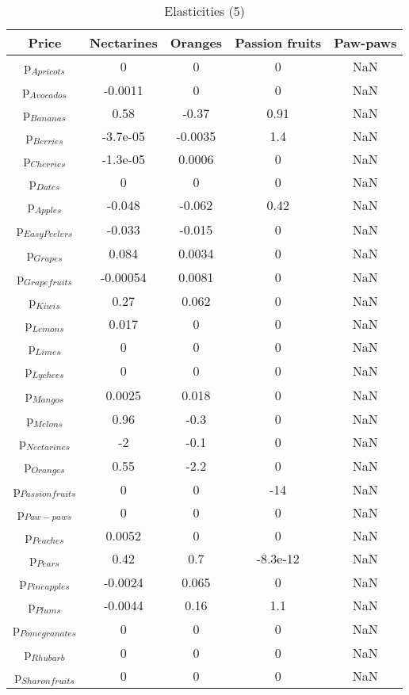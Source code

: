 \documentclass[11pt]{article}
\begin{document}
\begin{table}[h]
\caption{Elasticities (5)}
\label{Table: elasticities 5}
\begin{center}
\begin{tabular}{ccccc}
Price & Nectarines & Oranges & Passion fruits & Paw-paws \\ \hline
p$_{Apricots}$ & 0 & 0 & 0 & NaN \\ 
p$_{Avocados}$ & -0.0011 & 0 & 0 & NaN \\ 
p$_{Bananas}$ & 0.58 & -0.37 & 0.91 & NaN \\ 
p$_{Berries}$ & -3.7e-05 & -0.0035 & 1.4 & NaN \\ 
p$_{Cherries}$ & -1.3e-05 & 0.0006 & 0 & NaN \\ 
p$_{Dates}$ & 0 & 0 & 0 & NaN \\ 
p$_{Apples}$ & -0.048 & -0.062 & 0.42 & NaN \\ 
p$_{Easy Peelers}$ & -0.033 & -0.015 & 0 & NaN \\ 
p$_{Grapes}$ & 0.084 & 0.0034 & 0 & NaN \\ 
p$_{Grapefruits}$ & -0.00054 & 0.0081 & 0 & NaN \\ 
p$_{Kiwis}$ & 0.27 & 0.062 & 0 & NaN \\ 
p$_{Lemons}$ & 0.017 & 0 & 0 & NaN \\ 
p$_{Limes}$ & 0 & 0 & 0 & NaN \\ 
p$_{Lychees}$ & 0 & 0 & 0 & NaN \\ 
p$_{Mangos}$ & 0.0025 & 0.018 & 0 & NaN \\ 
p$_{Melons}$ & 0.96 & -0.3 & 0 & NaN \\ 
p$_{Nectarines}$ & -2 & -0.1 & 0 & NaN \\ 
p$_{Oranges}$ & 0.55 & -2.2 & 0 & NaN \\ 
p$_{Passion fruits}$ & 0 & 0 & -14 & NaN \\ 
p$_{Paw-paws}$ & 0 & 0 & 0 & NaN \\ 
p$_{Peaches}$ & 0.0052 & 0 & 0 & NaN \\ 
p$_{Pears}$ & 0.42 & 0.7 & -8.3e-12 & NaN \\ 
p$_{Pineapples}$ & -0.0024 & 0.065 & 0 & NaN \\ 
p$_{Plums}$ & -0.0044 & 0.16 & 1.1 & NaN \\ 
p$_{Pomegranates}$ & 0 & 0 & 0 & NaN \\ 
p$_{Rhubarb}$ & 0 & 0 & 0 & NaN \\ 
p$_{Sharon fruits}$ & 0 & 0 & 0 & NaN \\ 
\end{tabular}
\end{center}
\end{table}
\end{document}
